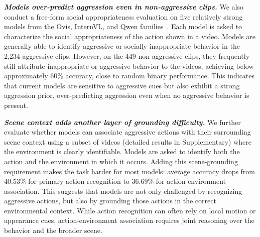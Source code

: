 \noindent\textbf{\textit{Models over-predict aggression even in non-aggressive clips.}}
We also conduct a free-form social appropriateness evaluation on five relatively strong models from the Ovis, InternVL, and Qwen families~\cite{ovis2_5, internvl2_5, qwen3vl}. Each model is asked to characterize the social appropriateness of the action shown in a video. Models are generally able to identify aggressive or socially inappropriate behavior in the 2,234 aggressive clips. However, on the 449 non-aggressive clips, they frequently still attribute inappropriate or aggressive behavior to the videos, achieving below approximately 60\% accuracy, close to random binary performance. This indicates that current models are sensitive to aggressive cues but also exhibit a strong aggression prior, over-predicting aggression even when no aggressive behavior is present.


\noindent\textbf{\textit{Scene context adds another layer of grounding difficulty.}}
We further evaluate whether models can associate aggressive actions with their surrounding scene context using a subset of videos (detailed results in Supplementary) where the environment is clearly identifiable. Models are asked to identify both the action and the environment in which it occurs. Adding this scene-grounding requirement makes the task harder for most models: average accuracy drops from 40.53\% for primary action recognition to 36.69\% for action-environment association. This suggests that models are not only challenged by recognizing aggressive actions, but also by grounding those actions in the correct environmental context. While action recognition can often rely on local motion or appearance cues, action-environment association requires joint reasoning over the behavior and the broader scene.


